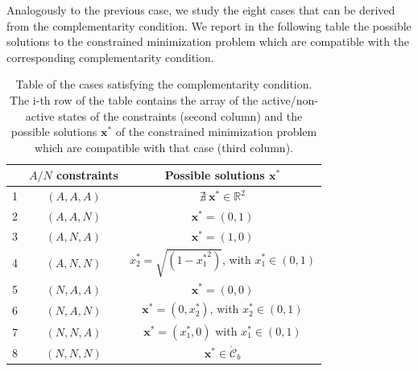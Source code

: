 \documentclass[a4paper,11pt]{article}
\begin{document}
\noindent Analogously to the previous case, we study the eight cases that can be derived from the complementarity condition. We report in the following table the possible solutions to the constrained minimization problem which are compatible with the corresponding complementarity condition.
\begin{table}[H]
	\centering
	\begin{tabular}{|c|c|c|}
		\hline
		& $A/N$ constraints & Possible solutions $\textbf{x}^*$ \\
		\hline
		1 & $(A, A, A)$ & $\nexists \ \textbf{x}^* \in \mathbb{R}^{2}$\\
		2 & $(A, A, N)$ & $\textbf{x}^* = (0,1)$\\
		3 & $(A, N, A)$ & $\textbf{x}^* = (1,0)$\\
		4 & $(A, N, N)$ & $x_{2}^* = \sqrt{(1-{x_{1}^*}^2)}$, with $x_{1}^* \in (0,1)$\\
		5 & $(N, A, A)$ & $\textbf{x}^* = (0,0)$\\
		6 & $(N, A, N)$ & $\textbf{x}^* = (0,x_{2}^*)$, with $x_{2}^* \in (0,1)$\\
		7 & $(N, N, A)$ & $\textbf{x}^* = (x_{1}^*,0)$ with $x_{1}^* \in (0,1)$\\
		8 & $(N, N, N)$ & $\textbf{x}^* \in \mathring{\mathcal{C}}_{b}$\\
		\hline
	\end{tabular}
	\caption{Table of the cases satisfying the complementarity condition. The i-th row of the table contains the array of the active/non-active states of the constraints (second column) and the possible solutions $\textbf{x}^*$ of the constrained minimization problem which are compatible with that case (third column).}
	\label{tab:complementarity conditions f_b}
\end{table}
\end{document}
